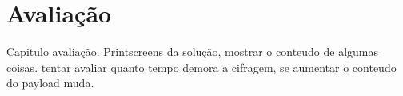 \chapter{Avaliação}
\label{cap:avaliacao}

Capitulo avaliação. Printscreens da solução, mostrar o conteudo de algumas coisas. tentar avaliar quanto tempo demora a cifragem, se aumentar o conteudo do payload muda.
